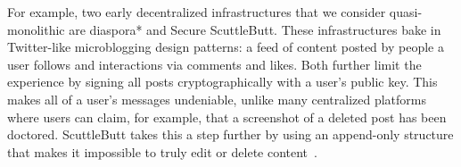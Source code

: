 

For example, two early decentralized infrastructures that we consider quasi-monolithic are diaspora* and Secure ScuttleButt.
These infrastructures bake in Twitter-like microblogging design patterns: a feed of content posted by people a user follows and interactions via comments and likes.
Both further limit the experience by signing all posts cryptographically with a user's public key. This makes all of a user's messages undeniable, unlike many centralized platforms where users can claim, for example, that a screenshot of a deleted post has been doctored.
ScuttleButt takes this a step further by using an append-only structure that makes it impossible to truly edit or delete content~\cite{diaspora, securescuttlebutt}.



